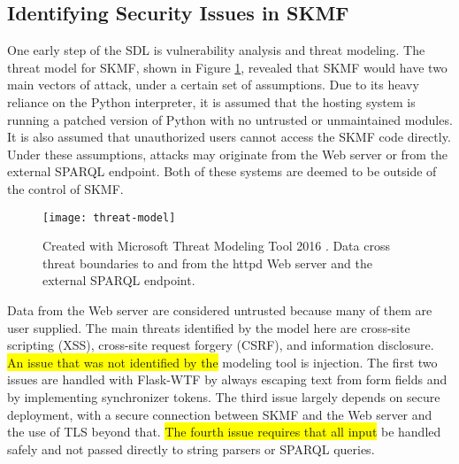 \subsection{Identifying Security Issues in SKMF}
\label{method:threats}

One early step of the SDL is vulnerability analysis and threat modeling. The threat model for SKMF, shown in Figure
\ref{threat-model},
revealed that SKMF would have two main vectors of attack, under a certain set of assumptions. Due to its heavy reliance on the Python interpreter, it is assumed that the hosting system is running a patched version of Python with no untrusted or unmaintained modules. It is also assumed that unauthorized users cannot access the SKMF code directly. Under these assumptions, attacks may originate from the Web server or from the external SPARQL endpoint. Both of these systems are deemed to be outside of the control of SKMF.

\begin{figure}[p]
\texttt{[image: threat-model]}
\caption[Data flow diagram with threat boundaries]
 {\narrower Created with Microsoft Threat Modeling Tool 2016
  \cite{mstmt}.
  Data cross threat boundaries to and from the httpd Web server and the external SPARQL endpoint.
 }
\label{threat-model}
\end{figure}

Data from the Web server are considered untrusted because many of them are user supplied. The main threats identified by the model here are cross-site scripting (XSS), cross-site request forgery (CSRF), and information disclosure.
\colorbox{yellow}{An issue that was not identified by the}
modeling tool is injection. The first two issues are handled with Flask-WTF by always escaping text from form fields and by implementing synchronizer tokens. The third issue largely depends on secure deployment, with a secure connection between SKMF and the Web server and the use of TLS beyond that.
\colorbox{yellow}{The fourth issue requires that all input}
be handled safely and not passed directly to string parsers or SPARQL queries.

